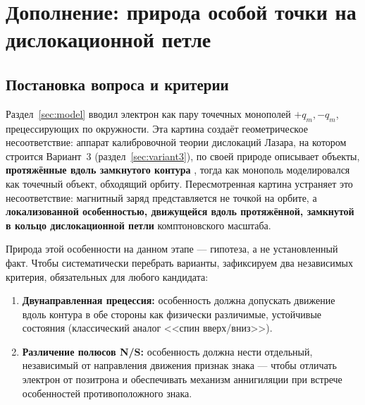\documentclass[12pt,a4paper]{article}
\begin{document}

\section{Дополнение: природа особой точки на дислокационной петле}
\label{sec:singularity-nature}

\subsection{Постановка вопроса и критерии}

Раздел~\ref{sec:model} вводил электрон как пару точечных монополей
$+q_m,-q_m$, прецессирующих по окружности. Эта картина создаёт
геометрическое несоответствие: аппарат калибровочной теории
дислокаций Лазара, на котором строится Вариант~3
(раздел~\ref{sec:variant3}), по своей природе описывает объекты,
\textbf{протяжённые вдоль замкнутого контура} \cite{Lazar2010}, тогда
как монополь моделировался как точечный объект, обходящий орбиту.
Пересмотренная картина устраняет это несоответствие: магнитный заряд
представляется не точкой на орбите, а \textbf{локализованной
особенностью, движущейся вдоль протяжённой, замкнутой в кольцо
дислокационной петли} комптоновского масштаба.

Природа этой особенности на данном этапе --- гипотеза, а не
установленный факт. Чтобы систематически перебрать варианты, зафиксируем
два независимых критерия, обязательных для любого кандидата:

\begin{enumerate}
\item[\textbf{К1}] \textbf{Двунаправленная прецессия:} особенность
должна допускать движение вдоль контура в обе стороны как физически
различимые, устойчивые состояния (классический аналог <<спин вверх/вниз>>).
\item[\textbf{К2}] \textbf{Различение полюсов N/S:} особенность должна
нести отдельный, независимый от направления движения признак знака ---
чтобы отличать электрон от позитрона и обеспечивать механизм аннигиляции
при встрече особенностей противоположного знака.
\end{enumerate}
\end{document}
